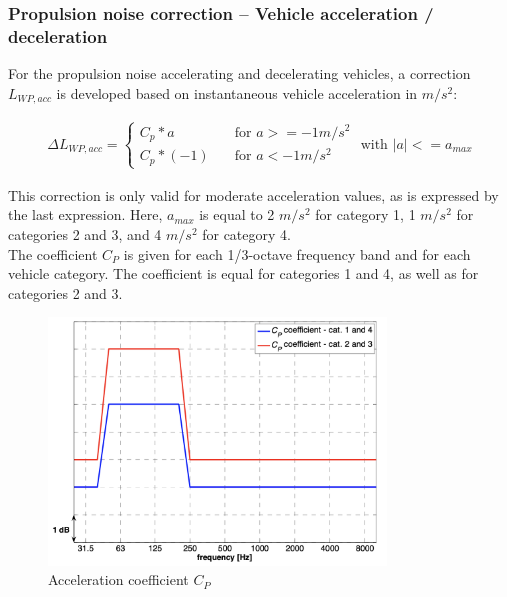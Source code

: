 \documentclass{article}
\begin{document}
\subsubsection{Propulsion noise correction – Vehicle acceleration / deceleration}

\noindent For the propulsion noise accelerating and decelerating vehicles, a correction $L_{WP,acc}$ is developed based on instantaneous vehicle acceleration in $m/s^2$:


\begin{equation}
    \label{LAmax}
    \begin{aligned}
        \Delta L_{WP,acc} =
        \begin{cases}
        C_p*a       & \quad \text{for } a>=-1 m/s^2 \\
        C_p*(-1)  & \quad \text{for } a<-1 m/s^2
        \end{cases} \text{ with } |a|<=a_{max}
    \end{aligned}
\end{equation}

\noindent This correction is only valid for moderate acceleration values, as is expressed by the last expression. Here, $a_{max}$ is equal to 2 $m/s^2$ for category 1, 1 $m/s^2$ for categories 2 and 3, and 4 $m/s^2$ for category 4. \\
The coefficient $C_P$ is given for each 1/3-octave frequency band and for each vehicle category. The coefficient is equal for categories 1 and 4, as well as for categories 2 and 3.

\begin{figure}[H]
\caption{Acceleration coefficient $C_P$}
\label{Acceleration coefficient C_P}
\centering
\includegraphics[width=0.8\textwidth]{IMAGINE/Acceleration coefficient C_P.png}
\end{figure}
\end{document}
